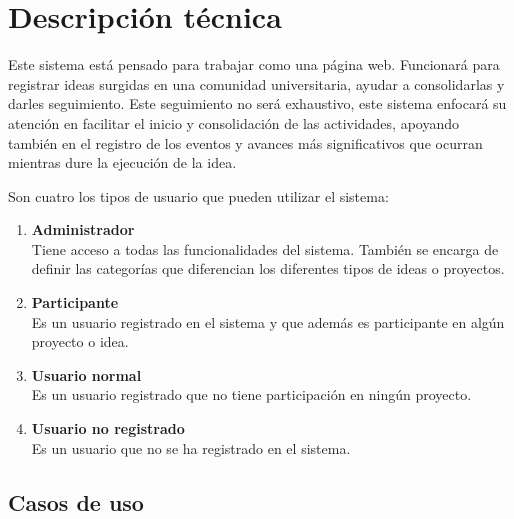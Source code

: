 \documentclass[11pt,letterpaper,titlepage]{article}
\begin{document}
\section{Descripci\'on t\'ecnica}

Este sistema est\'a pensado para trabajar como una p\'agina web. Funcionar\'a para registrar ideas surgidas en una comunidad universitaria, ayudar a consolidarlas y darles seguimiento. Este seguimiento no ser\'a exhaustivo, este sistema enfocar\'a su atenci\'on  en facilitar el inicio  y consolidaci\'on de las actividades, apoyando tambi\'en en el registro de los eventos y avances m\'as significativos que ocurran mientras dure la ejecuci\'on de la idea.

Son cuatro los tipos de usuario que pueden utilizar el sistema:
\begin{enumerate}
 \item \textbf{Administrador}\\Tiene acceso a todas las funcionalidades del sistema. Tambi\'en se encarga de definir las categor\'ias que diferencian los diferentes tipos de ideas o proyectos.
 \item \textbf{Participante}\\Es un usuario registrado en el sistema y que adem\'as  es participante en alg\'un proyecto o idea.
 \item \textbf{Usuario normal}\\Es un usuario registrado que no tiene participaci\'on en ning\'un proyecto.
 \item \textbf{Usuario no registrado}\\Es un usuario que no se ha registrado en el sistema.
\end{enumerate}




\subsection{Casos de uso}
\end{document}
